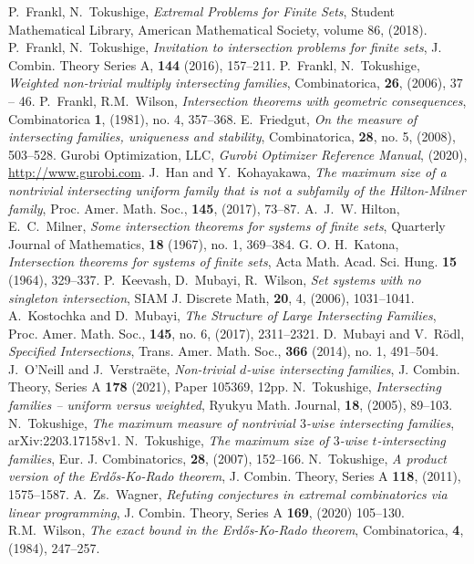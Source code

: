 \documentclass[12pt]{article}
\theoremstyle{definition}
\begin{document}
\begin{thebibliography}{}
P.~Frankl, N.~Tokushige, \emph{Extremal Problems for Finite Sets}, Student Mathematical Library, American Mathematical Society, volume 86, (2018). 
P.~Frankl, N.~Tokushige, \emph{Invitation to intersection problems for finite sets}, J. Combin. Theory Series A, {\bf 144} (2016), 157--211. 
P.~Frankl, N.~Tokushige, \emph{Weighted non-trivial multiply intersecting families}, Combinatorica, {\bf 26}, (2006), 37 -- 46.
P.~Frankl, R.M.~Wilson, \emph{Intersection theorems with geometric consequences}, Combinatorica {\bf 1}, (1981), no. 4, 357--368.
E.~Friedgut, \emph{On the measure of intersecting families, uniqueness and stability}, Combinatorica, {\bf 28}, no. 5, (2008), 503--528.  
Gurobi Optimization, LLC, \emph{Gurobi Optimizer Reference Manual}, (2020), \url{http://www.gurobi.com}.
J.~Han and Y.~Kohayakawa, \emph{The maximum size of a nontrivial intersecting uniform family that is not a subfamily of the Hilton-Milner family}, Proc. Amer. Math. Soc., {\bf 145}, (2017), 73--87. 
A.~J.~W. Hilton, E.~C.~Milner, \emph{Some intersection theorems for systems of finite sets}, Quarterly Journal of Mathematics, {\bf 18} (1967), no. 1, 369--384. 
G. O. H.~Katona, \emph{Intersection theorems for systems of finite sets}, Acta Math. Acad. Sci. Hung. {\bf 15} (1964), 329--337. 
P.~Keevash, D.~Mubayi, R.~Wilson, \emph{Set systems with no singleton intersection}, SIAM J. Discrete Math, {\bf 20}, 4, (2006), 1031--1041. 
A.~Kostochka and D.~Mubayi, \emph{The Structure of Large Intersecting Families}, Proc. Amer. Math. Soc., {\bf 145}, no. 6, (2017), 2311--2321. 
D.~Mubayi and V.~R\"{o}dl, \emph{Specified Intersections}, Trans. Amer. Math. Soc., {\bf 366} (2014), no. 1, 491--504. 
J.~O'Neill and J.~Verstra\"{e}te, \emph{Non-trivial $d$-wise intersecting families}, J. Combin. Theory, Series A {\bf 178} (2021), Paper 105369, 12pp. 
N.~Tokushige, \emph{Intersecting families -- uniform versus weighted}, Ryukyu Math. Journal, {\bf 18}, (2005), 89--103. 
N.~Tokushige, \emph{The maximum measure of nontrivial $3$-wise intersecting families}, arXiv:2203.17158v1. 
N.~Tokushige, \emph{The maximum size of $3$-wise $t$-intersecting families}, Eur. J. Combinatorics, {\bf 28}, (2007), 152--166. 
N.~Tokushige, \emph{A product version of the Erd\H{o}s-Ko-Rado theorem}, J. Combin. Theory, Series A {\bf 118}, (2011), 1575--1587. 
A.~Zs.~Wagner, \emph{Refuting conjectures in extremal combinatorics via linear programming}, J. Combin. Theory, Series A {\bf 169}, (2020) 105--130. 
R.M.~Wilson, \emph{The exact bound in the Erd\H{o}s-Ko-Rado theorem}, Combinatorica, {\bf 4}, (1984), 247--257.

\end{thebibliography}
\end{document}
